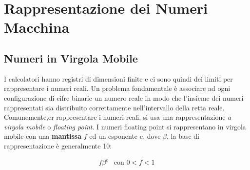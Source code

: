 \chapter{Rappresentazione dei Numeri Macchina}


\section{Numeri in Virgola Mobile}

I calcolatori hanno registri di dimensioni finite e
ci sono quindi dei limiti per rappresentare i numeri reali.
Un problema fondamentale è associare ad ogni configurazione di cifre
binarie un numero reale in modo che l'insieme dei numeri rappresentati
sia distribuito correttamente nell'intervallo della retta reale.
Comunemente,er rappresentare i numeri reali, si usa una rappresentazione
\textit{a virgola mobile} o \textit{floating point}.
I numeri floating point si rappresentano in virgola mobile con una \textbf{mantissa} $f$ ed un esponente $e$, dove $\beta$, la base di rappresentazione è generalmente 10:

\begin{eqnarray*}
    f \beta^e & \text{con } 0 < f < 1
\end{eqnarray*}

